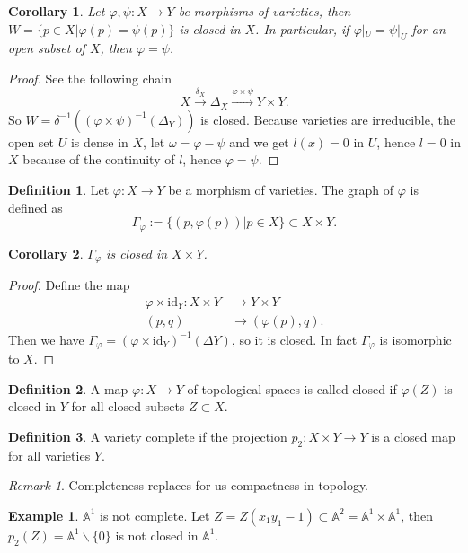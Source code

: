 \documentclass{amsart}
\theoremstyle{plain}
\newtheorem{corollary}{Corollary}
\theoremstyle{definition}
\newtheorem{definition}{Definition}
\newtheorem{example}{Example}
\theoremstyle{remark}
\newtheorem*{remark}{Remark}
\numberwithin{equation}{section}
\begin{document}
\begin{corollary}
	Let $ \varphi,\psi:X\to Y $ be morphisms of varieties, then $ W=\{ p\in X|\varphi(p)=\psi(p) \} $ is closed in $ X $. In particular, if $ \varphi|_U=\psi|_U $ for an open subset of $ X $, then $ \varphi=\psi $.
\end{corollary}
\begin{proof}
	See the following chain
	$$
		X\xrightarrow{\delta_X} \Delta_X\xrightarrow{\varphi\times\psi} Y\times Y.
	$$
	So $ W=\delta^{-1}( (\varphi\times\psi)^{-1}(\Delta_Y) ) $ is closed. Because varieties are irreducible, the open set $ U $ is dense in $ X $, let $ \omega = \varphi-\psi $ and we get $ l(x)=0 $ in $ U $, hence $ l=0 $ in $ X $ because of the continuity of $ l $, hence $ \varphi=\psi $.
\end{proof}
\begin{definition}
	Let $ \varphi :X\to Y $ be a morphism of varieties. The graph of $ \varphi $ is defined as
	\begin{equation}
		\Gamma_{\varphi}:=\{ \left(p,\varphi\left(p\right)\right)| p\in X \}\subset X\times Y.
	\end{equation}
\end{definition}
\begin{corollary}
	$ \Gamma_\varphi $ is closed in $ X\times Y $.
\end{corollary}
\begin{proof}
	Define the map
	$$\begin{array}{cc}
		\varphi\times\text{id}_Y : X\times Y & \to Y\times Y\\
		(p,q) & \to (\varphi(p),q).
	\end{array}$$
	Then we have $ \Gamma_\varphi = (\varphi\times\text{id}_Y)^{-1}(\Delta Y) $, so it is closed. In fact $ \Gamma_\varphi $ is isomorphic to $ X $.
\end{proof}
\begin{definition}
	A map $ \varphi:X\to Y $ of topological spaces is called closed if $ \varphi(Z) $ is closed in $ Y $ for all closed subsets $ Z\subset X $.
\end{definition}
\begin{definition}
	A variety complete if the projection $ p_2:X\times Y\to Y $ is a closed map for all varieties $ Y $.
\end{definition}
\begin{remark}
	Completeness replaces for us compactness in topology.
\end{remark}
\begin{example}
	$ \mathbb{A}^1 $ is not complete. Let $ Z=Z(x_1y_1-1)\subset \mathbb{A}^2=\mathbb{A}^1\times \mathbb{A}^1 $, then $ p_2(Z)=\mathbb{A}^1\backslash\{ 0 \} $ is not closed in $ \mathbb{A}^1 $.
\end{example}
\end{document}

